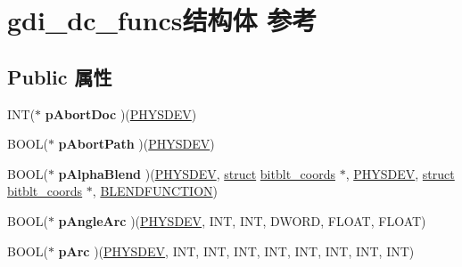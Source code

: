 \hypertarget{structgdi__dc__funcs}{}\section{gdi\+\_\+dc\+\_\+funcs结构体 参考}
\label{structgdi__dc__funcs}
\subsection*{Public 属性}
\begin{DoxyCompactItemize}
\item 
\mbox{\label{structgdi__dc__funcs_a2712230c5dd7aa9ea0b261c7f3a58a92}} 
I\+NT($\ast$ {\bfseries p\+Abort\+Doc} )(\hyperlink{structgdi__physdev}{P\+H\+Y\+S\+D\+EV})
\item 
\mbox{\label{structgdi__dc__funcs_abf8326a019e15b80975b544f2349e8fa}} 
B\+O\+OL($\ast$ {\bfseries p\+Abort\+Path} )(\hyperlink{structgdi__physdev}{P\+H\+Y\+S\+D\+EV})
\item 
\mbox{\label{structgdi__dc__funcs_ac2eece1d766f99c396a1bc5c10fb624e}} 
B\+O\+OL($\ast$ {\bfseries p\+Alpha\+Blend} )(\hyperlink{structgdi__physdev}{P\+H\+Y\+S\+D\+EV}, \hyperlink{interfacestruct}{struct} \hyperlink{structbitblt__coords}{bitblt\+\_\+coords} $\ast$, \hyperlink{structgdi__physdev}{P\+H\+Y\+S\+D\+EV}, \hyperlink{interfacestruct}{struct} \hyperlink{structbitblt__coords}{bitblt\+\_\+coords} $\ast$, \hyperlink{struct___b_l_e_n_d_f_u_n_c_t_i_o_n}{B\+L\+E\+N\+D\+F\+U\+N\+C\+T\+I\+ON})
\item 
\mbox{\label{structgdi__dc__funcs_a68e53492897e05d59b61d5a0eaa567f4}} 
B\+O\+OL($\ast$ {\bfseries p\+Angle\+Arc} )(\hyperlink{structgdi__physdev}{P\+H\+Y\+S\+D\+EV}, I\+NT, I\+NT, D\+W\+O\+RD, F\+L\+O\+AT, F\+L\+O\+AT)
\item 
\mbox{\label{structgdi__dc__funcs_a72b371540f8a77acfecfb4007b4f1dcf}} 
B\+O\+OL($\ast$ {\bfseries p\+Arc} )(\hyperlink{structgdi__physdev}{P\+H\+Y\+S\+D\+EV}, I\+NT, I\+NT, I\+NT, I\+NT, I\+NT, I\+NT, I\+NT, I\+NT)
\item 
\mbox{\label{structgdi__dc__funcs_aebe97dde7016655d179481645b2fba7d}} 

\end{DoxyCompactItemize}
